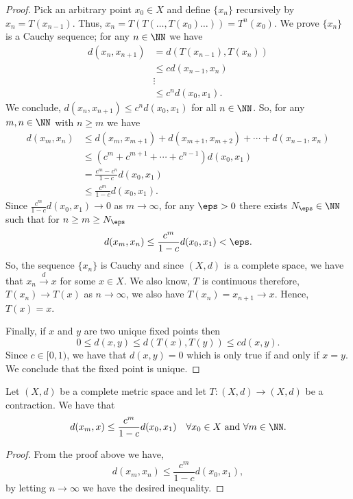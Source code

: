 \documentclass[12pt, a4paper]{article}
\begin{document}
\begin{proof}
    Pick an arbitrary point \(x_0 \in X\) and define \(\{x_n\}\) recursively by \(x_n = T(x_{n-1})\). Thus, \(x_n = T(T(\ldots,T(x_0)\ldots))=T^n(x_0)\). We prove \(\{x_n\}\) is a Cauchy sequence; for any \(n \in \NN\) we have 
    \[\begin{aligned}
        d(x_n,x_{n+1}) &= d(T(x_{n-1}),T(x_n)) \\
        &\leq cd(x_{n-1},x_n) \\
        &\vdots \\
        &\leq c^n d(x_0,x_1).
    \end{aligned}\]
    We conclude, \(d(x_n,x_{n+1}) \leq c^n d(x_0,x_1)\) for all \(n \in \NN\). So, for any \(m,n \in \NN\) with \(n \geq m\) we have 
    \[\begin{aligned}
        d(x_m,x_n) &\leq d(x_m,x_{m+1})+d(x_{m+1},x_{m+2})+\cdots+ d(x_{n-1},x_n) \\
        &\leq (c^m +c^{m+1} + \cdots + c^{n-1}) d(x_0,x_1) \\
        &= \frac{c^m-c^n}{1-c} d(x_0,x_1) \\
        &\leq \frac{c^m}{1-c} d(x_0,x_1).
    \end{aligned}\]
    Since \(\frac{c^m}{1-c} d(x_0,x_1) \to 0\) as \(m \to \infty\), for any \(\eps>0\) there exists \(N_{\eps} \in \NN\) such that for \(n \geq m \geq N_{\eps}\)
    \[d(x_m,x_n) \leq \frac{c^m}{1-c} d(x_0,x_1) < \eps.\]
    So, the sequence \(\{x_n\}\) is Cauchy and since \((X,d)\) is a complete space, we have that \(x_n \xrightarrow{d} x\) for some \(x \in X\). We also know, \(T\) is continuous therefore, \(T(x_n) \to T(x)\) as \(n \to \infty\), we also have \(T(x_n)=x_{n+1} \to x\). Hence, \(T(x)=x\).

    Finally, if \(x\) and \(y\) are two unique fixed points then 
    \[0 \leq d(x,y) \leq d(T(x),T(y)) \leq cd(x,y).\]
    Since \(c \in [0,1)\), we have that \(d(x,y)=0\) which is only true if and only if \(x=y\). We conclude that the fixed point is unique.
\end{proof}

\begin{mdcor}
    Let \((X,d)\) be a complete metric space and let \(T : (X,d) \to (X,d)\) be a contraction. We have that 
    \[d(x_m,x) \leq \frac{c^m}{1-c} d(x_0,x_1) \quad \forall x_0 \in X \text{ and } \forall m \in \NN.\]
\end{mdcor}

\begin{proof}
    From the proof above we have,
    \[d(x_m,x_n) \leq \frac{c^m}{1-c} d(x_0,x_1),\]
    by letting \(n \to \infty\) we have the desired inequality.
\end{proof}
\end{document}
